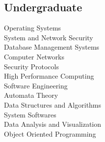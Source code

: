 \documentclass[]{deedy-resume-openfont}
\begin{document}
\begin{minipage}[t]{0.33\textwidth}
\subsection{Undergraduate}
Operating Systems \\
System and Network Security \\
Database Management Systems \\
Computer Networks \\
Security Protocols \\
High Performance Computing\\
Software Engineering\\
Automata Theory\\
Data Structures and Algorithms\\
System Softwares\\
Data Analysis and Visualization\\
Object Oriented Programming\\
\sectionsep

%
%

\end{minipage} 
\hfill
\end{document}
